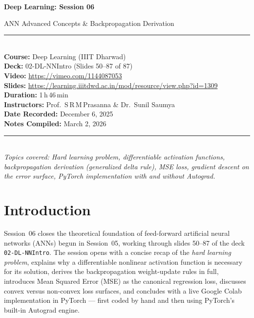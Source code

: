 \documentclass[12pt,a4paper]{article}
\begin{document}
\begin{titlepage}
  \centering
  \vspace*{2cm}
  {\Huge\bfseries Deep Learning: Session 06\par}
  \vspace{0.5cm}
  {\LARGE ANN Advanced Concepts \& Backpropagation Derivation\par}
  \vspace{1.5cm}
  \rule{\linewidth}{0.4pt}\\[0.4cm]
  {\large
    \textbf{Course:} Deep Learning (IIIT Dharwad)\\[0.3cm]
    \textbf{Deck:} 02-DL-NNIntro (Slides 50--87 of 87)\\[0.3cm]
    \textbf{Video:} \url{https://vimeo.com/1144087053}\\[0.3cm]
    \textbf{Slides:} \url{https://learning.iiitdwd.ac.in/mod/resource/view.php?id=1309}\\[0.3cm]
    \textbf{Duration:} 1\,h\,46\,min\\[0.3cm]
    \textbf{Instructors:} Prof.\ S\,R\,M\,Prasanna \& Dr.\ Sunil Saumya\\[0.3cm]
    \textbf{Date Recorded:} December 6, 2025\\[0.3cm]
    \textbf{Notes Compiled:} March 2, 2026
  }\\[1.0cm]
  \rule{\linewidth}{0.4pt}\\[1.5cm]
  {\large\itshape
    Topics covered: Hard learning problem, differentiable activation functions,
    backpropagation derivation (generalized delta rule), MSE loss, gradient
    descent on the error surface, PyTorch implementation with and without
    Autograd.
  }
  \vfill
\end{titlepage}

\tableofcontents
\newpage

\section{Introduction}
\label{sec:intro}

Session~06 closes the theoretical foundation of feed-forward artificial neural
networks (ANNs) begun in Session~05, working through slides 50--87 of the deck
\texttt{02-DL-NNIntro}.  The session opens with a concise recap of the
\emph{hard learning problem}, explains why a differentiable nonlinear activation
function is necessary for its solution, derives the backpropagation weight-update
rules in full, introduces Mean Squared Error (MSE) as the canonical regression
loss, discusses convex versus non-convex loss surfaces, and concludes with a
live Google Colab implementation in PyTorch --- first coded by hand and then
using PyTorch's built-in Autograd engine.
\end{document}
